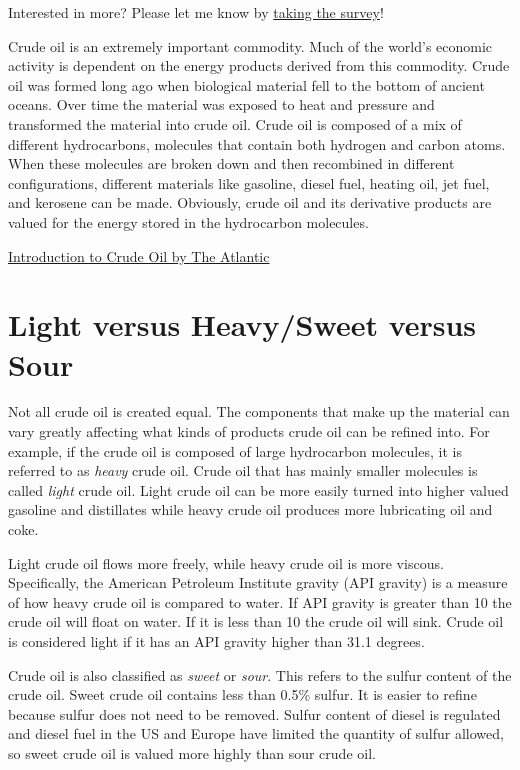 \documentclass[
  letterpaper,
  DIV=11,
  numbers=noendperiod]{scrreprt}
\begin{document}
{Interested in more? Please let me know by}
\href{https://forms.gle/Q3VByCQZHjfQSy9D7}{taking the survey}!

Crude oil is an extremely important commodity. Much of the world's
economic activity is dependent on the energy products derived from this
commodity. Crude oil was formed long ago when biological material fell
to the bottom of ancient oceans. Over time the material was exposed to
heat and pressure and transformed the material into crude oil. Crude oil
is composed of a mix of different hydrocarbons, molecules that contain
both hydrogen and carbon atoms. When these molecules are broken down and
then recombined in different configurations, different materials like
gasoline, diesel fuel, heating oil, jet fuel, and kerosene can be made.
Obviously, crude oil and its derivative products are valued for the
energy stored in the hydrocarbon molecules.

\href{https://www.youtube.com/watch?v=62LvVYYqUFA}{Introduction to Crude
Oil by The Atlantic}

\hypertarget{light-versus-heavysweet-versus-sour}{%
\section{Light versus Heavy/Sweet versus
Sour}\label{light-versus-heavysweet-versus-sour}}

Not all crude oil is created equal. The components that make up the
material can vary greatly affecting what kinds of products crude oil can
be refined into. For example, if the crude oil is composed of large
hydrocarbon molecules, it is referred to as \emph{heavy} crude oil.
Crude oil that has mainly smaller molecules is called \emph{light} crude
oil. Light crude oil can be more easily turned into higher valued
gasoline and distillates while heavy crude oil produces more lubricating
oil and coke.

Light crude oil flows more freely, while heavy crude oil is more
viscous. Specifically, the American Petroleum Institute gravity (API
gravity) is a measure of how heavy crude oil is compared to water. If
API gravity is greater than 10 the crude oil will float on water. If it
is less than 10 the crude oil will sink. Crude oil is considered light
if it has an API gravity higher than 31.1 degrees.

Crude oil is also classified as \emph{sweet} or \emph{sour}. This refers
to the sulfur content of the crude oil. Sweet crude oil contains less
than 0.5\% sulfur. It is easier to refine because sulfur does not need
to be removed. Sulfur content of diesel is regulated and diesel fuel in
the US and Europe have limited the quantity of sulfur allowed, so sweet
crude oil is valued more highly than sour crude oil.
\end{document}
